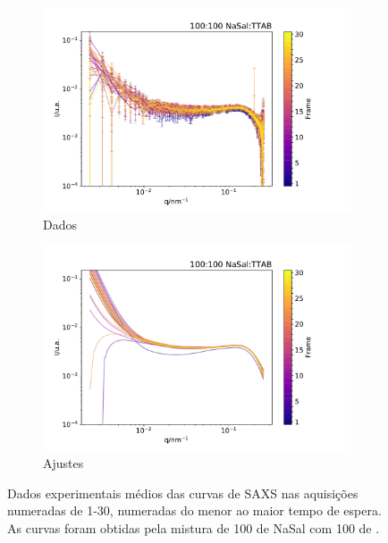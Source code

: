 	\begin{figure}[h]
		\begin{subfigure}[t]{0.5\textwidth}
			\centering
			\includegraphics[width=\textwidth]{imagens/saxs/TR_saxs_100_100_dados.pdf}
			\caption{Dados}
			\label{fig:saxs_tr_100_d}
		\end{subfigure}%
		\begin{subfigure}[t]{0.5\textwidth}
			\centering
			\includegraphics[width=\textwidth]{imagens/saxs/TR_saxs_100_100_ajustes.pdf}
			\caption{Ajustes}
			\label{fig:saxs_tr_100_a}
		\end{subfigure}
		\caption{Dados experimentais médios das curvas de SAXS nas aquisições numeradas de 1-30, numeradas do menor ao maior tempo de espera. As curvas foram obtidas pela mistura de 100 \mM{} de NaSal com 100 \mM{} de \TTAB.}
		\label{fig:saxs_tr_100}
	\end{figure} 
	
